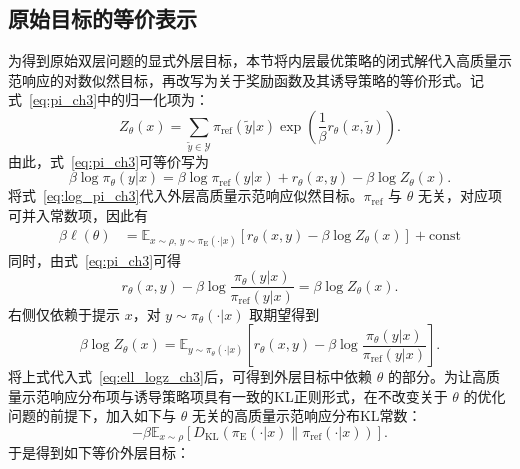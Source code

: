\subsection{原始目标的等价表示}

为得到原始双层问题的显式外层目标，本节将内层最优策略的闭式解代入高质量示范响应的对数似然目标，再改写为关于奖励函数及其诱导策略的等价形式。记式~\eqref{eq:pi_ch3}中的归一化项为：
\begin{equation}
    Z_\theta(x)=
    \sum_{\tilde{y}\in\mathcal{Y}}
    \pi_{\mathrm{ref}}(\tilde{y}|x)
    \exp\left(\frac{1}{\beta}r_\theta(x,\tilde{y})\right).
    \label{eq:z_ch3}
\end{equation}
由此，式~\eqref{eq:pi_ch3}可等价写为
\begin{equation}
    \beta\log\pi_\theta(y|x)
    =
    \beta\log\pi_{\mathrm{ref}}(y|x)
    +r_\theta(x,y)-\beta\log Z_\theta(x).
    \label{eq:log_pi_ch3}
\end{equation}
将式~\eqref{eq:log_pi_ch3}代入外层高质量示范响应似然目标。$\pi_{\mathrm{ref}}$ 与 $\theta$ 无关，对应项可并入常数项，因此有
\begin{equation}
\begin{aligned}
    \beta\ell(\theta)
    &=
    \mathbb{E}_{x\sim\rho,\,y\sim\pi_{\mathrm{E}}(\cdot|x)}
    \left[r_\theta(x,y)-\beta\log Z_\theta(x)\right]
    +\mathrm{const}
\end{aligned}
\label{eq:ell_logz_ch3}
\end{equation}
同时，由式~\eqref{eq:pi_ch3}可得
\begin{equation}
    r_\theta(x,y)-\beta\log\frac{\pi_\theta(y|x)}{\pi_{\mathrm{ref}}(y|x)}
    =\beta\log Z_\theta(x).
\end{equation}
右侧仅依赖于提示 $x$，对 $y\sim\pi_\theta(\cdot|x)$ 取期望得到
\begin{equation}
    \beta\log Z_\theta(x)
    =
    \mathbb{E}_{y\sim\pi_\theta(\cdot|x)}
    \left[
    r_\theta(x,y)-\beta\log\frac{\pi_\theta(y|x)}{\pi_{\mathrm{ref}}(y|x)}
    \right].
\end{equation}
将上式代入式~\eqref{eq:ell_logz_ch3}后，可得到外层目标中依赖 $\theta$ 的部分。为让高质量示范响应分布项与诱导策略项具有一致的KL正则形式，在不改变关于 $\theta$ 的优化问题的前提下，加入如下与 $\theta$ 无关的高质量示范响应分布KL常数：
\begin{equation}
    -\beta\mathbb{E}_{x\sim\rho}
    \left[D_{\mathrm{KL}}\!\left(\pi_{\mathrm{E}}(\cdot|x)\|\pi_{\mathrm{ref}}(\cdot|x)\right)\right].
\end{equation}
于是得到如下等价外层目标：
